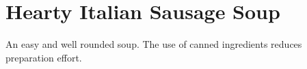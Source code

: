 \section[Hearty Italian]{Hearty Italian Sausage Soup}

\begin{recipestats}[
        servings=8,
        preptime=30 \minute,
        bakingtime=45 \minute,
        source=Pamela Teresi,
    ]
\end{recipestats}

\begin{recipeabstract}
    An easy and well rounded soup.
    The use of canned ingredients reduces preparation effort.
\end{recipeabstract}

\begin{ingredientcolumns}
    \begin{ingredientblock}
        \\
        \\
        \\
        \\
        \\
    \end{ingredientblock}
    \begin{ingredientblock}
        \\
        \\
        \\
        \\
    \end{ingredientblock}
\end{ingredientcolumns}

